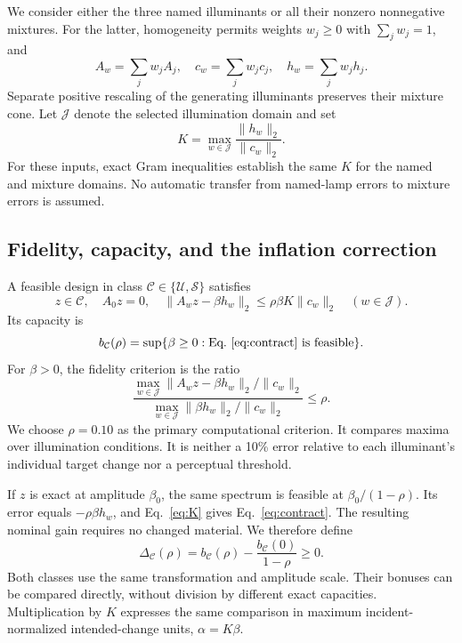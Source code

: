 \documentclass{optica-article}
\begin{document}
We consider either the three named illuminants or all their nonzero nonnegative mixtures. For the latter, homogeneity permits weights $w_j\geq0$ with $\sum_jw_j=1$, and
\begin{equation}
 A_w=\sum_jw_jA_j,\quad c_w=\sum_jw_jc_j,\quad h_w=\sum_jw_jh_j.
 \label{eq:mixture}
\end{equation}
Separate positive rescaling of the generating illuminants preserves their mixture cone. Let $\mathcal J$ denote the selected illumination domain and set
\begin{equation}
 K=\max_{w\in\mathcal J}\frac{\|h_w\|_2}{\|c_w\|_2}.
 \label{eq:K}
\end{equation}
For these inputs, exact Gram inequalities establish the same $K$ for the named and mixture domains. No automatic transfer from named-lamp errors to mixture errors is assumed.

\subsection{Fidelity, capacity, and the inflation correction}
A feasible design in class $\mathcal C\in\{\mathcal U,\mathcal S\}$ satisfies
\begin{equation}
 z\in\mathcal C,\quad A_0z=0,\quad
 \|A_wz-\beta h_w\|_2\leq\rho\beta K\|c_w\|_2
 \quad(w\in\mathcal J).
 \label{eq:contract}
\end{equation}
Its capacity is
\begin{equation}
 b_{\mathcal C}(\rho)=\sup\{\beta\geq0:\text{Eq.~\eqref{eq:contract} is feasible}\}.
 \label{eq:capacity}
\end{equation}
For $\beta>0$, the fidelity criterion is the ratio
\begin{equation}
 \frac{\displaystyle\max_{w\in\mathcal J}
 \|A_wz-\beta h_w\|_2/\|c_w\|_2}
 {\displaystyle\max_{w\in\mathcal J}
 \|\beta h_w\|_2/\|c_w\|_2}\leq\rho.
 \label{eq:relative}
\end{equation}
We choose $\rho=0.10$ as the primary computational criterion. It compares maxima over illumination conditions. It is neither a 10\% error relative to each illuminant's individual target change nor a perceptual threshold.

If $z$ is exact at amplitude $\beta_0$, the same spectrum is feasible at $\beta_0/(1-\rho)$. Its error equals $-\rho\beta h_w$, and Eq.~\eqref{eq:K} gives Eq.~\eqref{eq:contract}. The resulting nominal gain requires no changed material. We therefore define
\begin{equation}
 \Delta_{\mathcal C}(\rho)=b_{\mathcal C}(\rho)-\frac{b_{\mathcal C}(0)}{1-\rho}\geq0.
 \label{eq:bonus}
\end{equation}
Both classes use the same transformation and amplitude scale. Their bonuses can be compared directly, without division by different exact capacities. Multiplication by $K$ expresses the same comparison in maximum incident-normalized intended-change units, $\alpha=K\beta$.
\end{document}
